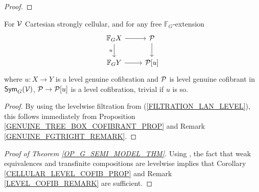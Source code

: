 \documentclass[a4paper,10pt]{article}%
\begin{document}
\begin{proof}

\end{proof} 

\begin{corollary}\label{CELLULAR_LEVEL_COFIB_PROP} 
  For $\V$ Cartesian strongly cellular, and for any free $\mathbb F_G$-extension  
  \[ 
  \begin{tikzcd} 
    \mathbb F_G X \arrow[d, "u"'] \arrow[r] & \P \arrow[d]\\ 
    \mathbb F_G Y \arrow[r] & \P[u] 
  \end{tikzcd} 
  \] 
  where $u: X \to Y$ is a level genuine cofibration and $\P$ is level genuine cofibrant in $\Sym_G(\V)$, $\P \to \P[u]$ is a level cofibration, trivial if $u$ is so. 
\end{corollary}  
\begin{proof} 
  By using the levelwise filtration from (\ref{FILTRATION_LAN_LEVEL}), this follows immediately from Proposition \ref{GENUINE_TREE_BOX_COFIBRANT_PROP} and Remark \ref{GENUINE_FGTRIGHT_REMARK}. 
\end{proof} 


\begin{proof}[Proof of Theorem \ref{OP_G_SEMI_MODEL_THM}] 
  Using \cite[Lemma 2.3]{SS00}, the fact that weak equivalences and transfinite compositions are levelwise implies that Corollary \ref{CELLULAR_LEVEL_COFIB_PROP} and Remark \ref{LEVEL_COFIB_REMARK} are sufficient.
\end{proof} 
\end{document}
